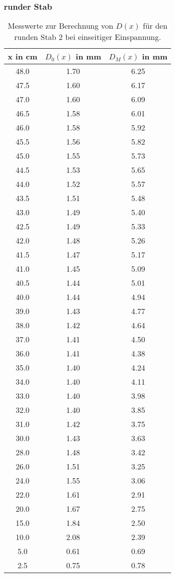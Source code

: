 \subsubsection{runder Stab}
\begin{table}
  \centering
  \begin{tabular}{c c c}
    \toprule
    x in \si{\centi\meter} & $D_0(x)$ in \si{\milli\meter} & $D_M(x)$ in \si{\milli\meter} \\
    \midrule
    48.0 & 1.70 & 6.25 \\
    47.5 & 1.60 & 6.17 \\
    47.0 & 1.60 & 6.09 \\
    46.5 & 1.58 & 6.01 \\
    46.0 & 1.58 & 5.92 \\
    45.5 & 1.56 & 5.82 \\
    45.0 & 1.55 & 5.73 \\
    44.5 & 1.53 & 5.65 \\
    44.0 & 1.52 & 5.57 \\
    43.5 & 1.51 & 5.48 \\
    43.0 & 1.49 & 5.40 \\
    42.5 & 1.49 & 5.33 \\
    42.0 & 1.48 & 5.26 \\
    41.5 & 1.47 & 5.17 \\
    41.0 & 1.45 & 5.09 \\
    40.5 & 1.44 & 5.01 \\
    40.0 & 1.44 & 4.94 \\
    39.0 & 1.43 & 4.77 \\
    38.0 & 1.42 & 4.64 \\
    37.0 & 1.41 & 4.50 \\
    36.0 & 1.41 & 4.38 \\
    35.0 & 1.40 & 4.24 \\
    34.0 & 1.40 & 4.11 \\
    33.0 & 1.40 & 3.98 \\
    32.0 & 1.40 & 3.85 \\
    31.0 & 1.42 & 3.75 \\
    30.0 & 1.43 & 3.63 \\
    28.0 & 1.48 & 3.42 \\
    26.0 & 1.51 & 3.25 \\
    24.0 & 1.55 & 3.06 \\
    22.0 & 1.61 & 2.91 \\
    20.0 & 1.67 & 2.75 \\
    15.0 & 1.84 & 2.50 \\
    10.0 & 2.08 & 2.39 \\
    5.0  & 0.61 & 0.69 \\
    2.5  & 0.75 & 0.78 \\
    \bottomrule
  \end{tabular}
  \caption{Messwerte zur Berechnung von $D(x)$ für den runden Stab 2 bei einseitiger
  Einspannung.}
  \label{tab:messung2}
\end{table}

